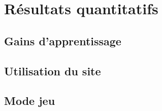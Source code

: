 
\chapter{Résultats quantitatifs}\label{chap:quantitatif}

\section{Gains d'apprentissage}

\section{Utilisation du site}

\section{Mode jeu}
